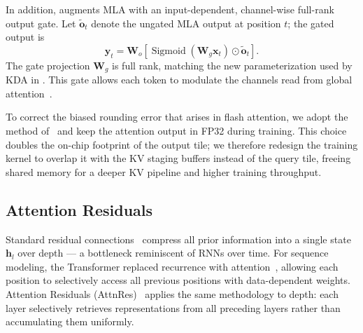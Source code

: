 In addition,  augments MLA with an input-dependent, channel-wise full-rank output gate.
Let $\tilde{\bm{o}}_t$ denote the ungated MLA output at position $t$; the gated output is
\begin{equation}
    \bm{y}_t
    = \mathbf{W}_o\!\left[
        \operatorname{Sigmoid}\!\left(\mathbf{W}_g\bm{x}_t\right)
        \odot \tilde{\bm{o}}_t
        \right].
    \label{eq:gated-mla-output}
\end{equation}
The gate projection $\mathbf{W}_g$ is full rank, matching the new parameterization used by KDA in . This gate allows each token to modulate the channels read from global attention~\citep{qiu2025gated}.

To correct the biased rounding error that arises in flash attention, we adopt the method of~\citep{qiu2025lowprecision} and keep the attention output in FP32 during training.
This choice doubles the on-chip footprint of the output tile; we therefore redesign the training kernel to overlap it with the KV staging buffers instead of the query tile, freeing shared memory for a deeper KV pipeline and higher training throughput.

\subsection{Attention Residuals}
\label{sec:attnres}

Standard residual connections~\citep{he2015resnet} compress all prior information into a single state $\bm{h}_l$ over depth --- a bottleneck reminiscent of RNNs over time. For sequence modeling, the Transformer replaced recurrence with attention~\citep{bahdanau2014attention,vaswani-2017-attention}, allowing each position to selectively access all previous positions with data-dependent weights. Attention Residuals (AttnRes)~\citep{kimiteam2026attnres} applies the same methodology to depth: each layer selectively retrieves representations from all preceding layers rather than accumulating them uniformly.

